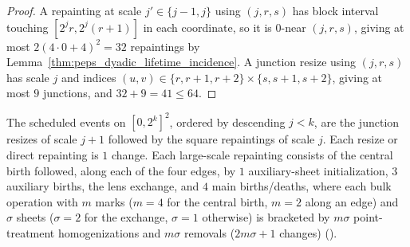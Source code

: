 \begin{proof}\leanok
    A repainting at scale $j'\in\{j-1,j\}$ using $(j,r,s)$ has block interval
    touching $[2^jr,2^j(r+1)]$ in each coordinate, so it is $0$-near $(j,r,s)$,
    giving at most $2(4\cdot0+4)^2=32$ repaintings by
    Lemma~\ref{thm:peps_dyadic_lifetime_incidence}. A junction resize using
    $(j,r,s)$ has scale $j$ and indices $(u,v)\in\{r,r+1,r+2\}\times\{s,s+1,s+2\}$,
    giving at most $9$ junctions, and $32+9=41\le64$.
\end{proof}

\begin{definition}
    \label{def:peps_dyadic_protocol_schedule}
    \leanok
    The scheduled events on $[0,2^k]^2$, ordered by descending $j<k$, are the
    junction resizes of scale $j+1$ followed by the square repaintings of scale
    $j$. Each resize or direct repainting is $1$ change. Each large-scale
    repainting consists of the central birth followed, along each of the four
    edges, by $1$ auxiliary-sheet initialization, $3$ auxiliary births, the lens
    exchange, and $4$ main births/deaths, where each bulk operation with $m$ marks
    ($m=4$ for the central birth, $m=2$ along an edge) and $\sigma$ sheets
    ($\sigma=2$ for the exchange, $\sigma=1$ otherwise) is bracketed by $m\sigma$
    point-treatment homogenizations and $m\sigma$ removals ($2m\sigma+1$ changes)
    (\cite[Proposition~7.1, \texttt{06-geometry.tex}, lines 82--221, 328--339, 507--541]{OpenAI2026PolynomialPEPS}).
\end{definition}

